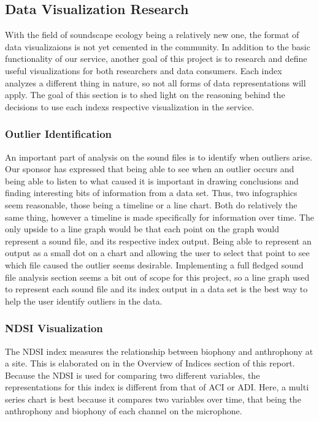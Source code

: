 \subsection{Data Visualization Research}
With the field of soundscape ecology being a relatively new one, the format of data visualizaions is not yet cemented in the community. In addition to the basic functionality of our service, another goal of this project is to research and define useful visualizations for both researchers and data consumers. Each index analyzes a different thing in nature, so not all forms of data representations will apply. The goal of this section is to shed light on the reasoning behind the decisions to use each index\textquotesingle s respective visualization in the service.

\subsubsection{Outlier Identification}
An important part of analysis on the sound files is to identify when outliers arise. Our sponsor has expressed that being able to see when an outlier occurs and being able to listen to what caused it is important in drawing conclusions and finding interesting bits of information from a data set. Thus, two infographics seem reasonable, those being a timeline or a line chart. Both do relatively the same thing, however a timeline is made specifically for information over time. The only upside to a line graph would be that each point on the graph would represent a sound file, and its respective index output. Being able to represent an output as a small dot on a chart and allowing the user to select that point to see which file caused the outlier seems desirable. Implementing a full fledged sound file analysis section seems a bit out of scope for this project, so a line graph used to represent each sound file and its index output in a data set is the best way to help the user identify outliers in the data.

\subsubsection{NDSI Visualization}
The NDSI index measures the relationship between biophony and anthrophony at a site. This is elaborated on in the Overview of Indices section of this report. Because the NDSI is used for comparing two different variables, the representations for this index is different from that of ACI or ADI. Here, a multi series chart is best because it compares two variables over time, that being the anthrophony and biophony of each channel on the microphone.


